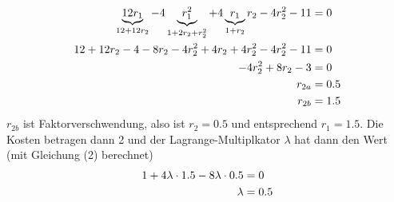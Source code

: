 \documentclass{article}
\begin{document}
\begin{enumerate}[label=(\alph*)]
		\begin{align}
			\underbrace{12r_1}_{12+12r_2}-4\underbrace{r_1^2}_{1+2r_2+r_2^2} + 4\underbrace{r_1}_{1+r_2}r_2 - 4r_2^2 - 11 &= 0 \notag \\
			12 + 12r_2 - 4 - 8r_2 - 4r_2^2 + 4r_2 + 4r_2^2 - 4r_2^2 - 11 &= 0 \notag \\
			-4r_2^2 + 8r_2 - 3 &=0 \notag \\
			r_{2a} &= 0.5 \notag \\
			r_{2b} &= 1.5 \notag
		\end{align}
		$r_{2b}$ ist Faktorverschwendung, also ist $r_2=0.5$ und entsprechend $r_1=1.5$. Die Kosten betragen dann 2 und der Lagrange-Multiplkator $\lambda$ hat dann den Wert (mit Gleichung (2) berechnet)
		\begin{align}
			1 + 4\lambda\cdot 1.5 - 8\lambda\cdot 0.5 &= 0 \notag \\
			\lambda &= 0.5 \notag
		\end{align}
	\end{enumerate}
\end{document}
